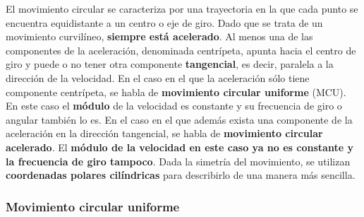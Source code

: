 \documentclass[a4paper,12pt,twoside]{book}
\begin{document}
\begin{mdframed}[style=explicacion]
    El movimiento circular se caracteriza por una trayectoria en la que cada punto se encuentra equidistante a un centro o eje de giro.
    Dado que se trata de un movimiento curvilíneo, \textbf{siempre está acelerado}.
    Al menos una de las componentes de la aceleración, denominada centrípeta, apunta hacia el centro de giro y puede o no tener otra componente \textbf{tangencial}, es decir, paralela a la dirección de la velocidad.
    En el caso en el que la aceleración sólo tiene componente centrípeta, se habla de \textbf{movimiento circular uniforme} (MCU).
    En este caso el \textbf{módulo} de la velocidad es constante y su frecuencia de giro o angular también lo es.
    En el caso en el que además exista una componente de la aceleración en la dirección tangencial, se habla de \textbf{movimiento circular acelerado}.
    El \textbf{módulo de la velocidad en este caso ya no es constante y la frecuencia de giro tampoco}.
    Dada la simetría del movimiento, se utilizan \textbf{coordenadas polares cilíndricas} para describirlo de una manera más sencilla.  
\end{mdframed}


\subsubsection{Movimiento circular uniforme}
\end{document}
